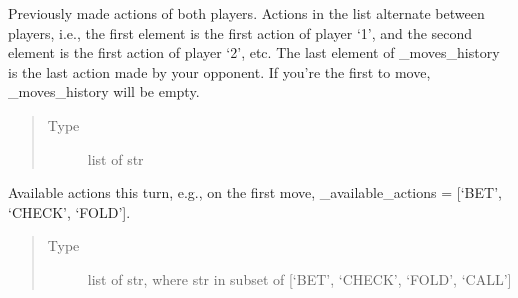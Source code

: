 \documentclass[letterpaper,10pt,english]{sphinxmanual}
\begin{document}
\begin{fulllineitems}
\begin{fulllineitems}
\begin{quote}
\begin{description}
\end{description}\end{quote}

\end{fulllineitems}


\begin{fulllineitems}
\label{\detokenize{client:client.state.ClientGameRoundState._moves_history}}
\pysigstartsignatures
{}
\pysigstopsignatures
\sphinxAtStartPar
Previously made actions of both players. Actions in the list alternate between players, i.e., the first element
is the first action of player ‘1’, and the second element is the first action of player ‘2’, etc. The last
element of \_moves\_history is the last action made by your opponent. If you’re the first to move, \_moves\_history
will be empty.
\begin{quote}\begin{description}
\item[{Type}] \leavevmode
\sphinxAtStartPar
list of str

\end{description}\end{quote}

\end{fulllineitems}


\begin{fulllineitems}
\label{\detokenize{client:client.state.ClientGameRoundState._available_actions}}
\pysigstartsignatures
{}
\pysigstopsignatures
\sphinxAtStartPar
Available actions this turn, e.g., on the first move, \_available\_actions = {[}‘BET’, ‘CHECK’, ‘FOLD’{]}.
\begin{quote}\begin{description}
\item[{Type}] \leavevmode
\sphinxAtStartPar
list of str, where str in subset of {[}‘BET’, ‘CHECK’, ‘FOLD’, ‘CALL’{]}

\end{description}\end{quote}


\end{fulllineitems}
\end{fulllineitems}
\end{document}
